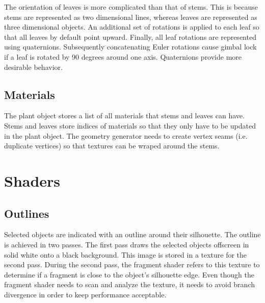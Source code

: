 \documentclass[10pt]{article}
\begin{document}
The orientation of leaves is more complicated than that of stems. This is because stems are represented as two dimensional lines, whereas leaves are represented as three dimensional objects. An additional set of rotations is applied to each leaf so that all leaves by default point upward. Finally, all leaf rotations are represented using quaternions. Subsequently concatenating Euler rotations cause gimbal lock if a leaf is rotated by 90 degrees around one axis. Quaternions provide more desirable behavior.

\subsection{Materials}

The plant object stores a list of all materials that stems and leaves can have. Stems and leaves store indices of materials so that they only have to be updated in the plant object. The geometry generator needs to create vertex seams (i.e. duplicate vertices) so that textures can be wraped around the stems.

\section{Shaders}

\subsection{Outlines}

Selected objects are indicated with an outline around their silhouette. The outline is achieved in two passes. The first pass draws the selected objects offscreen in solid white onto a black background. This image is stored in a texture for the second pass. During the second pass, the fragment shader refers to this texture to determine if a fragment is close to the object's silhouette edge. Even though the fragment shader needs to scan and analyze the texture, it needs to avoid branch divergence in order to keep performance acceptable.
\end{document}
